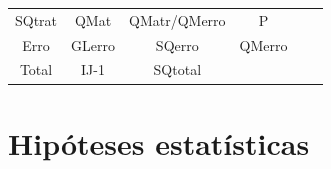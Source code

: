 \documentclass[12pt,brazil,oneside]{book}
\begin{document}
\begin{longtable}[]{@{}cccccc@{}}
\begin{minipage}[t]{0.14\columnwidth}
SQtrat\strut
\end{minipage} & \begin{minipage}[t]{0.14\columnwidth}\centering
QMat\strut
\end{minipage} & \begin{minipage}[t]{0.14\columnwidth}\centering
QMatr/QMerro\strut
\end{minipage} & \begin{minipage}[t]{0.14\columnwidth}\centering
P\strut
\end{minipage}\tabularnewline
\begin{minipage}[t]{0.14\columnwidth}\centering
Erro\strut
\end{minipage} & \begin{minipage}[t]{0.14\columnwidth}\centering
GLerro\strut
\end{minipage} & \begin{minipage}[t]{0.14\columnwidth}\centering
SQerro\strut
\end{minipage} & \begin{minipage}[t]{0.14\columnwidth}\centering
QMerro\strut
\end{minipage} & \begin{minipage}[t]{0.14\columnwidth}\centering
\strut
\end{minipage} & \begin{minipage}[t]{0.14\columnwidth}\centering
\strut
\end{minipage}\tabularnewline
\begin{minipage}[t]{0.14\columnwidth}\centering
Total\strut
\end{minipage} & \begin{minipage}[t]{0.14\columnwidth}\centering
IJ-1\strut
\end{minipage} & \begin{minipage}[t]{0.14\columnwidth}\centering
SQtotal\strut
\end{minipage} & \begin{minipage}[t]{0.14\columnwidth}\centering
\strut
\end{minipage} & \begin{minipage}[t]{0.14\columnwidth}\centering
\strut
\end{minipage} & \begin{minipage}[t]{0.14\columnwidth}\centering
\strut
\end{minipage}\tabularnewline
\bottomrule
\end{longtable}

\hypertarget{hipoteses-estatisticas}{%
\section{Hipóteses estatísticas}\label{hipoteses-estatisticas}}
\end{document}
